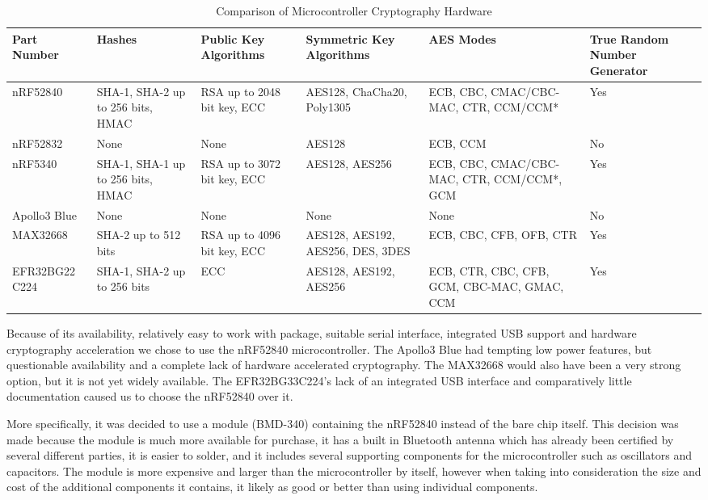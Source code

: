 \begin{table}[htb]
\centering
\begin{tabular}{>{\centering\arraybackslash}m{2.5cm}|
                >{\centering\arraybackslash}m{2.0cm}|
                >{\centering\arraybackslash}m{2.0cm}|
                >{\centering\arraybackslash}m{2.5cm}|
                >{\centering\arraybackslash}m{2.5cm}|
                >{\centering\arraybackslash}m{1.5cm}}
\toprule
Part Number & Hashes & Public Key Algorithms & Symmetric Key Algorithms & AES Modes & True Random Number Generator \\
\midrule
nRF52840 & SHA-1, SHA-2 up to 256 bits, HMAC & RSA up to 2048 bit key, ECC & AES128, ChaCha20, Poly1305 & ECB, CBC, CMAC/CBC-MAC, CTR, CCM/CCM* & Yes \\
nRF52832 & None & None & AES128 & ECB, CCM & No \\
nRF5340 & SHA-1, SHA-1 up to 256 bits, HMAC & RSA up to 3072 bit key, ECC & AES128, AES256 & ECB, CBC, CMAC/CBC-MAC, CTR, CCM/CCM*, GCM & Yes \\
Apollo3 Blue & None & None & None & None & No \\
MAX32668 & SHA-2 up to 512 bits & RSA up to 4096 bit key, ECC & AES128, AES192, AES256, DES, 3DES & ECB, CBC, CFB, OFB, CTR & Yes \\
EFR32BG22 C224 & SHA-1, SHA-2 up to 256 bits & ECC & AES128, AES192, AES256 & ECB, CTR, CBC, CFB, GCM, CBC-MAC, GMAC, CCM & Yes \\
\bottomrule
\end{tabular}
\caption{Comparison of Microcontroller Cryptography Hardware}
\label{tab:mcu-comp-crypto}
\end{table}

Because of its availability, relatively easy to work with package, suitable
serial interface, integrated USB support and hardware cryptography acceleration
we chose to use the nRF52840 microcontroller. The Apollo3 Blue had tempting low 
power features, but questionable availability and a complete lack of hardware 
accelerated cryptography. The MAX32668 would also have been a very strong 
option, but it is not yet widely available. The EFR32BG33C224's lack of an 
integrated USB interface and comparatively little documentation caused us to
choose the nRF52840 over it.

More specifically, it was decided to use a module (BMD-340) containing the
nRF52840 instead of the bare chip itself. This decision was made because 
the module is much more available for purchase, it has a built in Bluetooth 
antenna which has already been certified by several different parties, it is 
easier to solder, and it includes several supporting components for the 
microcontroller such as oscillators and capacitors. The module is more 
expensive and larger than the microcontroller by itself, however when taking 
into consideration the size and cost of the additional components it contains, 
it likely as good or better than using individual components.

